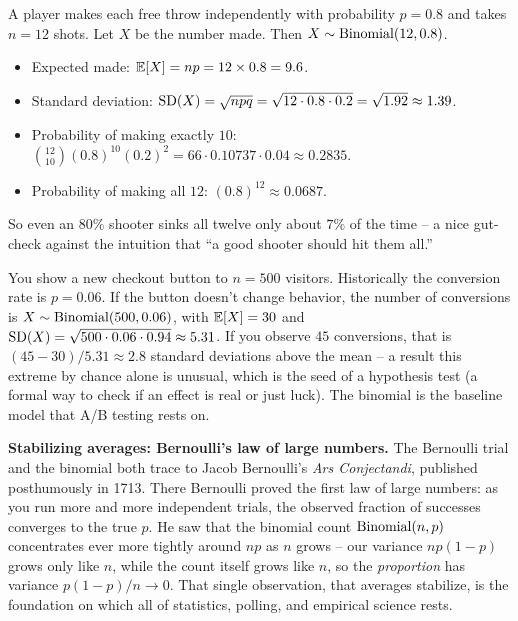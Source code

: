 \begin{example}
\label{ch07:ex-freethrows}
A player makes each free throw independently with probability $p = 0.8$ and takes
$n = 12$ shots. Let $X$ be the number made. Then $X \sim \operatorname{Binomial}(12, 0.8)$.
\begin{itemize}
\item Expected made: $\operatorname{\mathbb{E}}[X] = np = 12 \times 0.8 = 9.6$.
\item Standard deviation: $\operatorname{SD}(X) = \sqrt{npq} = \sqrt{12 \cdot 0.8 \cdot 0.2}
  = \sqrt{1.92} \approx 1.39$.
\item Probability of making exactly $10$:
  $\binom{12}{10}(0.8)^{10}(0.2)^{2} = 66 \cdot 0.10737 \cdot 0.04
  \approx 0.2835$.
\item Probability of making all $12$: $(0.8)^{12} \approx 0.0687$.
\end{itemize}
So even an $80\%$ shooter sinks all twelve only about $7\%$ of the time -- a nice
gut-check against the intuition that ``a good shooter should hit them all.''
\end{example}

\begin{example}
\label{ch07:ex-abtest}
You show a new checkout button to $n = 500$ visitors. Historically the conversion
rate is $p = 0.06$. If the button doesn't change behavior, the number of
conversions is $X \sim \operatorname{Binomial}(500, 0.06)$, with $\operatorname{\mathbb{E}}[X] = 30$ and
$\operatorname{SD}(X) = \sqrt{500 \cdot 0.06 \cdot 0.94} \approx 5.31$. If you observe
$45$ conversions, that is
$(45 - 30)/5.31 \approx 2.8$ standard deviations above the mean -- a result this
extreme by chance alone is unusual, which is the seed of a hypothesis test (a formal way to check if an effect is real or just luck). The
binomial is the baseline model that A/B testing rests on.
\end{example}

\begin{connectionbox}
\textbf{Stabilizing averages: Bernoulli's law of large numbers.}
The Bernoulli trial and the binomial both trace to Jacob Bernoulli's
\emph{Ars Conjectandi}, published posthumously in 1713. There Bernoulli proved the
first law of large numbers: as you run more and more independent trials, the
observed fraction of successes converges to the true $p$. He saw that the
binomial count $\operatorname{Binomial}(n,p)$ concentrates ever more tightly around $np$ as $n$ grows
-- our variance $np(1-p)$ grows only like $n$, while the count itself grows like
$n$, so the \emph{proportion} has variance $p(1-p)/n \to 0$. That single
observation, that averages stabilize, is the foundation on which all of
statistics, polling, and empirical science rests.
\end{connectionbox}

